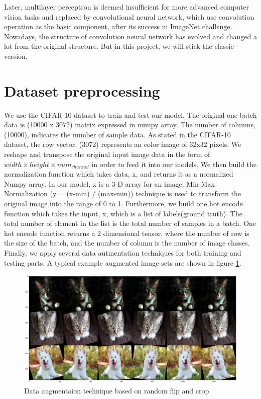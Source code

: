 \documentclass[11pt]{scrartcl}
\begin{document}
Later, multilayer perceptron is deemed insufficient for more advanced computer vision tasks and replaced by convolutional neural network\cite{krizhevsky2012imagenet}, which use convolution operation as the basic component, after its success in ImageNet challenge\cite{deng2009imagenet}. Nowadays, the structure of convolution neural network has evolved and changed a lot from the original structure. But in this project, we will stick the classic version.



\section{Dataset preprocessing}
We use the CIFAR-10 dataset to train and test our model. The original one batch data is (10000 x 3072) matrix expressed in numpy array. The number of columns, (10000), indicates the number of sample data. As stated in the CIFAR-10 dataset, the row vector, (3072) represents an color image of 32x32 pixels. 
We reshape and transpose the original input image data in the form of $width \times height \times num_{channel}$ in order to feed it into our models.
We then build the normalization function which takes data, x, and returns it as a normalized Numpy array. In our model, x is a  3-D array for an image. Min-Max Normalization (y = (x-min) / (max-min)) technique is used to transform the original image into the range of 0 to 1. 
Furthermore, we build one hot encode function which takes the input, x, which is a list of labels(ground truth). The total number of element in the list is the total number of samples in a batch. One hot encode function returns a 2 dimensional tensor, where the number of row is the size of the batch, and the number of column is the number of image classes.
Finally, we apply several data autmentation techniques for both training and testing parts. A typical example augmented image sets are shown in figure \ref{data_aug}.

\begin{figure}[H]
	\centering
	\includegraphics[width=0.9\linewidth]{fig/random_flip_crop_padding.png}
	\caption{Data augmentaion technique based on random flip and crop}
	\label{data_aug}
\end{figure}
\end{document}
